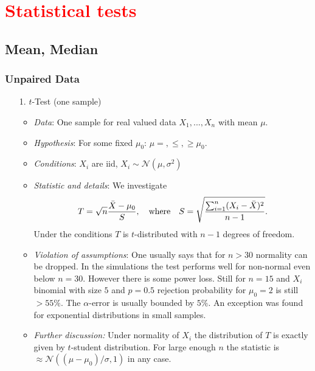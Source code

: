\documentclass[12pt,a4paper]{amsart}
\theoremstyle{definition}
\theoremstyle{remark}
\numberwithin{equation}{section}
\begin{document}
\section{\textcolor{red}{Statistical tests}}

\subsection{Mean, Median}

\subsubsection{Unpaired Data}

\begin{itemize}
\item[1.] $t$-Test (one sample)
\begin{itemize}
\item \textit{Data}:  One sample for real valued data $X_1,...,X_n$ with mean $\mu$.
\item \textit{Hypothesis}: For some fixed $\mu_0$: $\mu =, \le, \ge \mu_0$. 
\item \textit{Conditions}: $X_i$ are iid, $X_i \sim \mathcal{N}(\mu, \sigma^2)$
\item \textit{Statistic and details}: We investigate
$$T= \sqrt{n}\frac{\bar{X}-\mu_0}{S}, \quad \textnormal{where} \quad S=\sqrt{\frac{\sum_{i=1}^n (X_i-\bar{X})^2}{n-1}}.$$
Under the conditions $T$ is $t$-distributed with $n-1$ degrees of freedom. 
\item \textit{Violation of assumptions}:
One usually says that for $n>30$ normality can be dropped. In the simulations the test performs well for non-normal even below $n=30$. However there is some power loss. Still for $n=15$ and $X_i$ binomial with size $5$ and $p=0.5$ rejection probability for $\mu_0=2$ is still $>55\%$.  The $\alpha$-error is usually bounded by $5\%$. An exception was found for exponential distributions in small samples.
\item \textit{Further discussion:} Under normality of $X_i$ the distribution of $T$ is exactly given by $t$-student distribution. For large enough $n$ the statistic is $\approx \mathcal{N}((\mu-\mu_0)/\sigma, 1)$ in any case. \\
\end{itemize}


\end{itemize}
\end{document}

